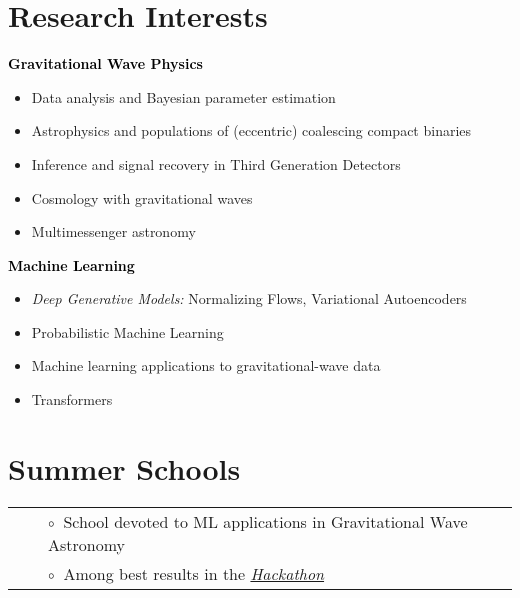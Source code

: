 

\section{Research Interests}
\textbf{\textcolor{black}{Gravitational Wave Physics}}
\begin{itemize}[label=-, leftmargin=0.5cm]
    \item Data analysis and Bayesian parameter estimation
    \item Astrophysics and populations of (eccentric) coalescing compact binaries
    \item Inference and signal recovery in Third Generation Detectors
    \item Cosmology with gravitational waves
    \item Multimessenger astronomy
\end{itemize}
\medskip
\textbf{\textcolor{black}{Machine Learning}}
\begin{itemize}[label=-, leftmargin=0.5cm]
    \item \textit{Deep Generative Models:} Normalizing Flows, Variational Autoencoders
    \item Probabilistic Machine Learning
    \item Machine learning applications to gravitational-wave data
    \item Transformers
\end{itemize}

\section{Summer Schools}
\begin{tabular}{rcl}
    &\hspace{0.4cm} &$\circ\;\;$School devoted to ML applications in Gravitational Wave Astronomy\\
    &\hspace{0.4cm} &$\circ\;\;$Among best results in the \href{https://github.com/niksterg/g2net_4th_training_school_thessaloniki_2023}{\textit{Hackathon}}\\
\end{tabular}
\vspace{0.2cm}


